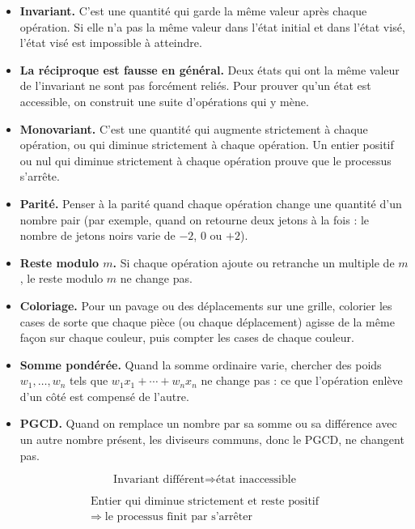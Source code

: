 \documentclass[11pt]{article}
\begin{document}
\begin{retenir}
\begin{itemize}
    \item \textbf{Invariant.} C'est une quantité qui garde la même valeur après
    chaque opération. Si elle n'a pas la même valeur dans l'état initial et
    dans l'état visé, l'état visé est impossible à atteindre.

    \item \textbf{La réciproque est fausse en général.} Deux états qui ont la
    même valeur de l'invariant ne sont pas forcément reliés. Pour prouver
    qu'un état est accessible, on construit une suite d'opérations qui y mène.

    \item \textbf{Monovariant.} C'est une quantité qui augmente strictement à
    chaque opération, ou qui diminue strictement à chaque opération. Un
    entier positif ou nul qui diminue strictement à chaque opération prouve que
    le processus s'arrête.

    \item \textbf{Parité.} Penser à la parité quand chaque opération change une
    quantité d'un nombre pair (par exemple, quand on retourne deux jetons à la
    fois : le nombre de jetons noirs varie de \(-2\), \(0\) ou \(+2\)).

    \item \textbf{Reste modulo \(m\).} Si chaque opération ajoute ou retranche
    un multiple de \(m\), le reste modulo \(m\) ne change pas.

    \item \textbf{Coloriage.} Pour un pavage ou des déplacements sur une
    grille, colorier les cases de sorte que chaque pièce (ou chaque
    déplacement) agisse de la même façon sur chaque couleur, puis compter les
    cases de chaque couleur.

    \item \textbf{Somme pondérée.} Quand la somme ordinaire varie, chercher des
    poids \(w_1,\dots,w_n\) tels que \(w_1x_1+\cdots+w_nx_n\) ne change pas :
    ce que l'opération enlève d'un côté est compensé de l'autre.

    \item \textbf{PGCD.} Quand on remplace un nombre par sa somme ou sa
    différence avec un autre nombre présent, les diviseurs communs, donc le
    PGCD, ne changent pas.
\end{itemize}

\[
\boxed{
\text{Invariant différent}
\Longrightarrow
\text{état inaccessible}
}
\]

\[
\boxed{\begin{gathered}
\text{Entier qui diminue strictement et reste positif}\\
\Longrightarrow\;
\text{le processus finit par s'arrêter}
\end{gathered}}
\]
\end{retenir}
\end{document}
